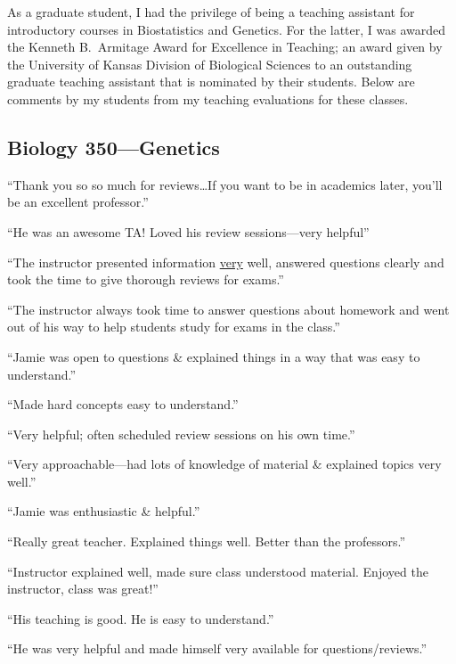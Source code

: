As a graduate student, I had the privilege of being a teaching assistant for
introductory courses in Biostatistics and Genetics.
For the latter, I was awarded the Kenneth B.\ Armitage Award for Excellence in
Teaching; an award given by the University of Kansas Division of Biological
Sciences to an outstanding graduate teaching assistant that is nominated by
their students.
Below are comments by my students from my teaching evaluations for these
classes.

\begin{multicols}{2}
\subsection*{Biology 350---Genetics}
\begin{myItemize}
\sffamily
\item ``Thank you so so much for reviews\ldots If you want to be in academics later, you'll be an excellent professor.''
\item ``He was an awesome TA! Loved his review sessions---very helpful''
\item ``The instructor presented information \underline{very} well, answered questions clearly and took the time to give thorough reviews for exams.''
\item ``The instructor always took time to answer questions about homework and went out of his way to help students study for exams in the class.''
\item ``Jamie was open to questions \& explained things in a way that was easy to understand.''
\item ``Made hard concepts easy to understand.''
\item ``Very helpful; often scheduled review sessions on his own time.''
\item ``Very approachable---had lots of knowledge of material \& explained topics very well.''
\item ``Jamie was enthusiastic \& helpful.''
\item ``Really great teacher. Explained things well. Better than the professors.''
\item ``Instructor explained well, made sure class understood material. Enjoyed the instructor, class was great!''
\item ``His teaching is good. He is easy to understand.''
\item ``He was very helpful and made himself very available for questions/reviews.''


\end{myItemize}
\end{multicols}
